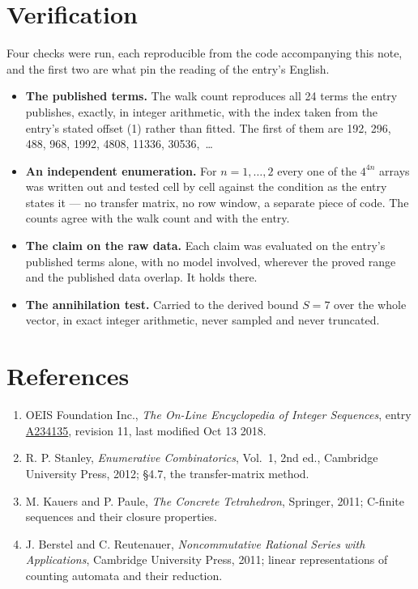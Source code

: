 \documentclass[11pt]{article}
\theoremstyle{definition}
\begin{document}
\section{Verification}

Four checks were run, each reproducible from the code accompanying this note, and the first two are what pin the reading of the entry's English.

\begin{itemize}

\item {\bfseries The published terms.} The walk count reproduces all 24 terms the entry publishes, exactly, in integer arithmetic, with the index taken from the entry's stated offset (1) rather than fitted. The first of them are 192, 296, 488, 968, 1992, 4808, 11336, 30536,~\dots

\item {\bfseries An independent enumeration.} For $n = 1,\dots,2$ every one of the $4^{4n}$ arrays was written out and tested cell by cell against the condition as the entry states it --- no transfer matrix, no row window, a separate piece of code. The counts agree with the walk count and with the entry.

\item {\bfseries The claim on the raw data.} Each claim was evaluated on the entry's published terms alone, with no model involved, wherever the proved range and the published data overlap. It holds there.

\item {\bfseries The annihilation test.} Carried to the derived bound $S = 7$ over the whole vector, in exact integer arithmetic, never sampled and never truncated.

\end{itemize}

\section{References}

\begin{enumerate}

\item OEIS Foundation Inc., \emph{The On-Line Encyclopedia of Integer Sequences}, entry \href{https://oeis.org/A234135}{A234135}, revision 11, last modified Oct 13 2018.

\item R. P. Stanley, \emph{Enumerative Combinatorics}, Vol.~1, 2nd ed., Cambridge University Press, 2012; \S4.7, the transfer-matrix method.

\item M. Kauers and P. Paule, \emph{The Concrete Tetrahedron}, Springer, 2011; C-finite sequences and their closure properties.

\item J. Berstel and C. Reutenauer, \emph{Noncommutative Rational Series with Applications}, Cambridge University Press, 2011; linear representations of counting automata and their reduction.

\end{enumerate}
\end{document}
